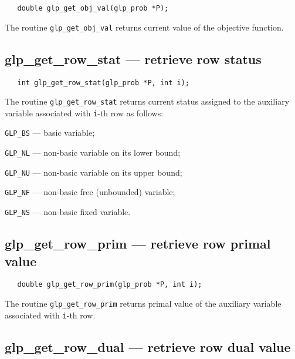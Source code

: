 \synopsis

\begin{verbatim}
   double glp_get_obj_val(glp_prob *P);
\end{verbatim}

\returns

The routine \verb|glp_get_obj_val| returns current value of the
objective function.

\subsection{glp\_get\_row\_stat --- retrieve row status}

\synopsis

\begin{verbatim}
   int glp_get_row_stat(glp_prob *P, int i);
\end{verbatim}

\returns

The routine \verb|glp_get_row_stat| returns current status assigned to
the auxiliary variable associated with \verb|i|-th row as follows:

\verb|GLP_BS| --- basic variable;

\verb|GLP_NL| --- non-basic variable on its lower bound;

\verb|GLP_NU| --- non-basic variable on its upper bound;

\verb|GLP_NF| --- non-basic free (unbounded) variable;

\verb|GLP_NS| --- non-basic fixed variable.


\subsection{glp\_get\_row\_prim --- retrieve row primal value}

\synopsis

\begin{verbatim}
   double glp_get_row_prim(glp_prob *P, int i);
\end{verbatim}

\returns

The routine \verb|glp_get_row_prim| returns primal value of the
auxiliary variable associated with \verb|i|-th row.

\subsection{glp\_get\_row\_dual --- retrieve row dual value}

